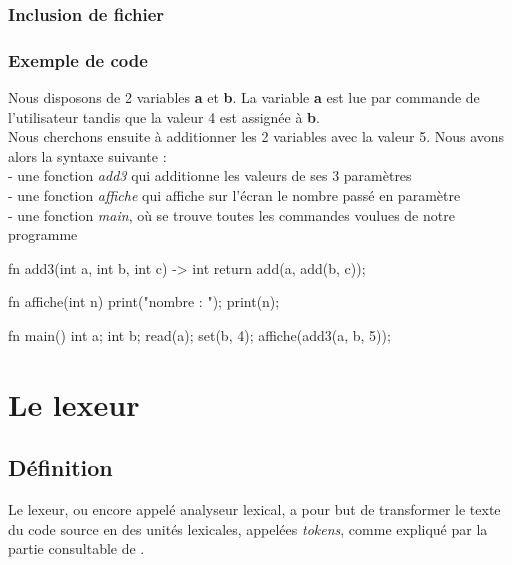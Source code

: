 \documentclass[a4paper]{article}%
\begin{document}
\subsubsection{Inclusion de fichier}

\subsubsection{Exemple de code}
Nous disposons de 2 variables \textbf{a} et \textbf{b}. La variable \textbf{a}
est lue par commande de l'utilisateur tandis que la valeur 4 est assignée à
\textbf{b}.\\
Nous cherchons ensuite à additionner les 2 variables avec la valeur 5. Nous avons alors la syntaxe suivante :\\
- une fonction \textit{add3} qui additionne les valeurs de ses 3 paramètres\\
- une fonction \textit{affiche} qui affiche sur l'écran le nombre passé en paramètre\\
- une fonction \textit{main}, où se trouve toutes les commandes voulues de notre programme\\

\begin{grammar}[language=C++]
fn add3(int a, int b, int c) -> int {
    return add(a, add(b, c));
}

fn affiche(int n) {
    print("nombre : ");
    print(n);
}

fn main() {
    int a;
    int b;
    read(a);
    set(b, 4);
    affiche(add3(a, b, 5));
}
\end{grammar}\leavevmode\newline


\clearpage{}%


\section{Le lexeur}

\subsection{Définition}

Le lexeur, ou encore appelé analyseur lexical, a pour but de transformer le
texte du code source en des unités lexicales, appelées \textit{tokens}, comme
expliqué par la partie consultable de  \cite{flexBisonHandbook}. \\
\end{document}
